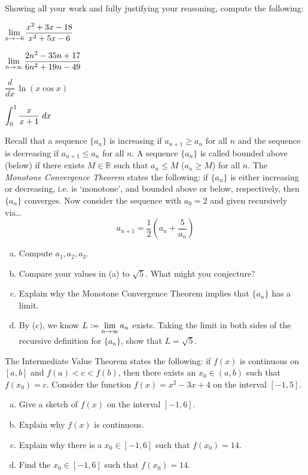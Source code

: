 \documentclass[11pt,letterpaper]{article}
\begin{document}

 Showing all your work and fully justifying your reasoning, compute the following:
	\begin{2enumerate}
	\item $\displaystyle \lim_{x \to -6} \dfrac{x^2 + 3x - 18}{x^2 + 5x - 6}$
	\item $\displaystyle \lim_{n \to \infty} \dfrac{2n^2 - 35n + 17}{6n^2 + 19n - 49}$
	\item $\dfrac{d}{dx} \, \ln \left(x \cos x \right)$
	\item $\displaystyle \int_0^1 \dfrac{x}{x + 1} \;dx$
	\end{2enumerate}



\newpage



 Recall that a sequence $\{ a_n \}$ is increasing if $a_{n+1} \geq a_n$ for all $n$ and the sequence is decreasing if $a_{n+1} \leq a_n$ for all $n$. A sequence $\{ a_n \}$ is called bounded above (below) if there exists $M \in \mathbb{R}$ such that $a_n \leq M$ ($a_n \geq M$) for all $n$. The \textit{Monotone Convergence Theorem} states the following: if $\{ a_n \}$ is either increasing or decreasing, i.e. is `monotone', and bounded above or below, respectively, then $\{ a_n \}$ converges. Now consider the sequence with $a_0= 2$ and given recursively via\dots
	\[
	a_{n+1}= \dfrac{1}{2} \left( a_n + \dfrac{5}{a_n} \right)
	\]

\begin{enumerate}[(a)]
\item Compute $a_1, a_2, a_3$. 
\item Compare your values in (a) to $\sqrt{5}$. What might you conjecture?
\item Explain why the Monotone Convergence Theorem implies that $\{ a_n \}$ has a limit. 
\item By (c), we know $L:= \displaystyle \lim_{n \to \infty} a_n$ exists. Taking the limit in both sides of the recursive definition for $\{ a_n \}$, show that $L= \sqrt{5}$. 
\end{enumerate}



\newpage



 The Intermediate Value Theorem states the following: if $f(x)$ is continuous on $[a, b]$ and $f(a) < c < f(b)$, then there exists an $x_0 \in (a, b)$ such that $f(x_0)= c$. Consider the function $f(x)= x^2 - 3x + 4$ on the interval $[-1, 5]$. 
	\begin{enumerate}[(a)]
	\item Give a sketch of $f(x)$ on the interval $[-1, 6]$. 
	\item Explain why $f(x)$ is continuous. 
	\item Explain why there is a $x_0 \in [-1, 6]$ such that $f(x_0)= 14$. 
	\item Find the $x_0 \in [-1, 6]$ such that $f(x_0)= 14$. 
	\end{enumerate}
\end{document}
